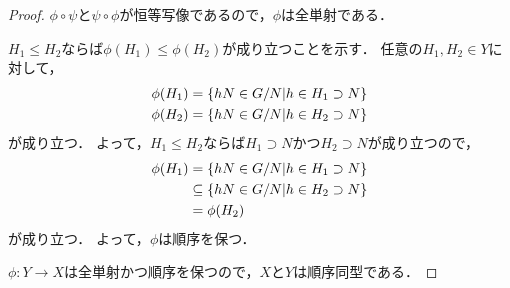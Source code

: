 \begin{proof}
    $\phi\circ\psi$と$\psi\circ\phi$が恒等写像であるので，$\phi$は全単射である．

    $H_1 \leq H_2$ならば$\phi(H_1) \leq \phi(H_2)$が成り立つことを示す．
    任意の$H_1,H_2\in Y$に対して，
    \begin{align}
        \phi(H_1) &= \left\{hN \in G/N | h \in H_1 \supset N\right\} \notag\\
        \phi(H_2) &= \left\{hN \in G/N | h \in H_2 \supset N\right\} \notag
    \end{align}
    が成り立つ．
    よって，$H_1 \leq H_2$ならば$H_1 \supset N$かつ$H_2 \supset N$が成り立つので，
    \begin{align}
        \phi(H_1) &= \left\{hN \in G/N | h \in H_1 \supset N\right\} \notag\\
        &\subseteq \left\{hN \in G/N | h \in H_2 \supset N\right\} \notag\\
        &= \phi(H_2) \notag
    \end{align}
    が成り立つ．
    よって，$\phi$は順序を保つ．

    $\phi : Y \to X$は全単射かつ順序を保つので，$X$と$Y$は順序同型である．


\end{proof}
